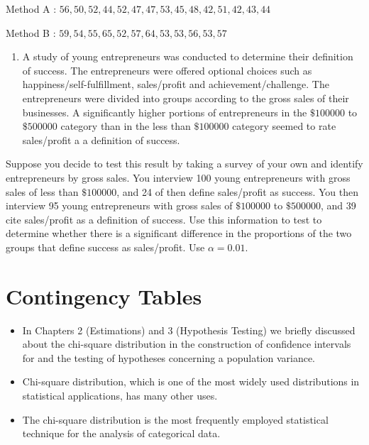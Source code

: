 \documentclass[]{book}
\providecommand{\tightlist}{%
  \setlength{\itemsep}{0pt}\setlength{\parskip}{0pt}}
\begin{document}
Method A : \(56,50,52,44,52,47,47,53,45,48,42,51,42,43,44\)

Method B : \(59,54,55,65,52,57,64,53,53,56,53,57\)

\begin{enumerate}
\def\labelenumi{\arabic{enumi}.}
\setcounter{enumi}{11}
\tightlist
\item
  A study of young entrepreneurs was conducted to determine their definition of success. The entrepreneurs were offered optional choices such as happiness/self-fulfillment, sales/profit and achievement/challenge. The entrepreneurs were divided into groups according to the gross sales of their businesses. A significantly higher portions of entrepreneurs in the \(\$100000\) to \(\$500000\) category than in the less than \(\$100000\) category seemed to rate sales/profit a a definition of success.
\end{enumerate}

Suppose you decide to test this result by taking a survey of your own and identify entrepreneurs by gross sales. You interview 100 young entrepreneurs with gross sales of less than \(\$100000\), and 24 of then define sales/profit as success. You then interview 95 young entrepreneurs with gross sales of \(\$100000\) to \(\$500000\), and 39 cite sales/profit as a definition of success. Use this information to test to determine whether there is a significant difference in the proportions of the two groups that define success as sales/profit. Use \(\alpha =0.01.\)

\hypertarget{contingency-tables}{%
\chapter{Contingency Tables}\label{contingency-tables}}

\begin{itemize}
\item
  In Chapters 2 (Estimations) and 3 (Hypothesis Testing) we briefly discussed about the chi-square distribution in the construction of confidence intervals for and the testing of hypotheses concerning a population variance.
\item
  Chi-square distribution, which is one of the most widely used distributions in statistical applications, has many other uses.
\item
  The chi-square distribution is the most frequently employed statistical technique for the analysis of categorical data.
\end{itemize}
\end{document}

